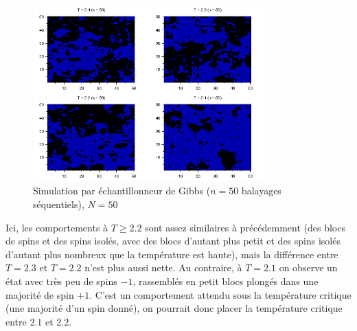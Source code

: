 \documentclass[a4paper,11pt]{article}
\begin{document}
\begin{figure}[!htbp]
	\label{fig:tc_gibbs_N50_n50}
	\includegraphics[width=0.8\textwidth]{temperature_critique_gibbs_N50_n50.png}
	\caption{Simulation par échantillonneur de Gibbs ($n = 50$ balayages séquentiels), $N = 50$}
\end{figure}
Ici, les comportements à $T \geq 2.2$ sont assez similaires à précédemment (des blocs de spins et des spins isolés, avec des blocs d'autant plus petit et des spins isolés d'autant plus nombreux que la température est haute), mais la différence entre $T = 2.3$ et $T = 2.2$ n'est plus aussi nette. Au contraire, à $T = 2.1$ on observe un état avec très peu de spins $-1$, rassemblés en petit blocs plongés dans une majorité de spin $+1$. C'est un comportement attendu sous la température critique (une majorité d'un spin donné), on pourrait donc placer la température critique entre $2.1$ et $2.2$.
\end{document}
